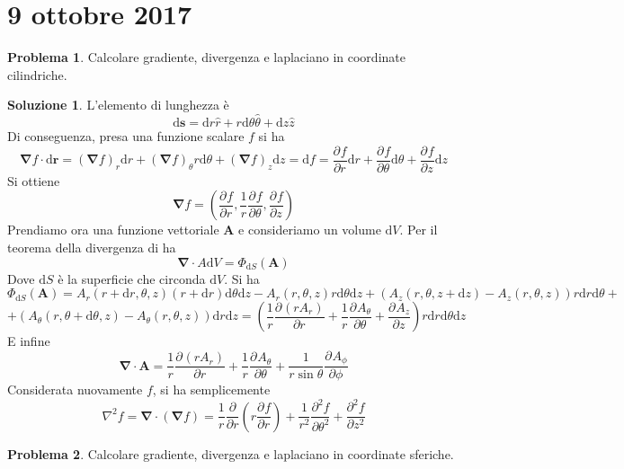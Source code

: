 \documentclass[a4paper,11pt]{book}
\newcommand{\dif}{\mathrm{d}}
\newcommand{\der}[3][]{\frac{\partial ^{#1}#2}{\partial {#3}^{#1}}}
\let\oldnabla\nabla
\renewcommand{\nabla}{\vec{\oldnabla}}
\newcommand{\lap}{\oldnabla^2}
\renewcommand{\vec}[1]{\mathbf{#1}}
\theoremstyle{theorem}
\theoremstyle{definition}
\newtheorem{problema}{Problema}[section]
\newtheorem{soluzione}{Soluzione}[section]
\begin{document}
\section{9 ottobre 2017}
\begin{problema}
	Calcolare gradiente, divergenza e laplaciano in coordinate cilindriche.
\end{problema}
\begin{soluzione}
	L'elemento di lunghezza è
	\[\dif\vec{s}=\dif r\hat{r}+r\dif\theta\hat{\theta}+\dif z\hat{z}\]
	Di conseguenza, presa una funzione scalare $f$ si ha
	\[\nabla f\cdot\dif\vec{r}=\left(\nabla f\right)_r\dif r+\left(\nabla f\right)_\theta r\dif\theta+\left(\nabla f\right)_z\dif z=\dif f=\der{f}{r}\dif r+\der{f}{\theta}\dif \theta+\der{f}{z}\dif z\]
	Si ottiene
	\[\nabla f=\left(\der{f}{r},\frac{1}{r}\der{f}{\theta},\der{f}{z}\right)\]
	Prendiamo ora una funzione vettoriale $\vec{A}$ e consideriamo un volume $\dif V$. Per il teorema della divergenza di ha
	\[\nabla\cdot A\dif V=\Phi_{\dif S}(\vec{A})\]
	Dove $\dif S$ è la superficie che circonda $\dif V$. Si ha
	\[\Phi_{\dif S}(\vec{A})=A_r(r+\dif r,\theta,z)(r+\dif r)\dif\theta\dif z-A_r(r,\theta,z)r\dif\theta\dif z+\left(A_z(r,\theta,z+\dif z)-A_z(r,\theta,z)\right)r\dif r\dif\theta+\]\[+\left(A_\theta(r,\theta+\dif\theta,z)-A_\theta(r,\theta,z)\right)\dif r\dif z=\left(\frac{1}{r}\der{(rA_r)}{r}+\frac{1}{r}\der{A_\theta}{\theta}+\der{A_z}{z}\right)r\dif r\dif\theta\dif z\]
	E infine
	\[\nabla\cdot\vec{A}=\frac{1}{r}\der{(rA_r)}{r}+\frac{1}{r}\der{A_\theta}{\theta}+\frac{1}{r\sin\theta}\der{A_\phi}{\phi}\]
	Considerata nuovamente $f$, si ha semplicemente
	\[\lap f=\nabla\cdot\left(\nabla f\right)=\frac{1}{r}\frac{\partial}{\partial r}\left(r\der{f}{r}\right)+\frac{1}{r^2}\der[2]{f}{\theta}+\der[2]{f}{z}\]
\end{soluzione}
\begin{problema}
	Calcolare gradiente, divergenza e laplaciano in coordinate sferiche.
\end{problema}
\end{document}
